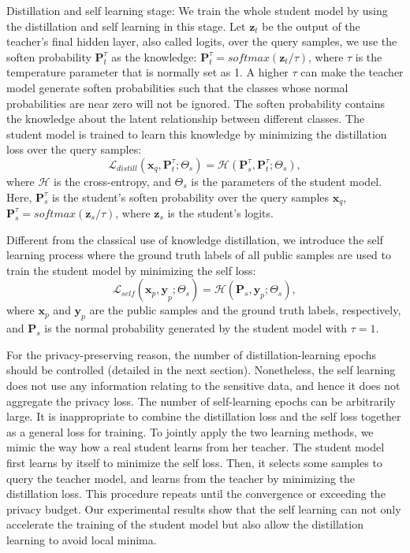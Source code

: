\documentclass[letterpaper]{article} %
\begin{document}
Distillation and self learning stage: We train the whole student model by using the distillation and self learning in this stage. Let $\textbf{z}_t$ be the output of the teacher's final hidden layer, also called logits, over the query samples, we use the soften probability \cite{hinton2015distilling} $\textbf{P}^\tau_t$ as the knowledge: $\textbf{P}^\tau_t=softmax(\textbf{z}_t/\tau)$, where $\tau$ is the temperature parameter that is normally set as 1. A higher $\tau$ can make the teacher model generate soften probabilities such that the classes whose normal probabilities are near zero will not be ignored. The soften probability contains the knowledge about the latent relationship between different classes. The student model is trained to learn this knowledge by minimizing the distillation loss over the query samples:
\begin{equation}\label{eqn:distill-loss}
\mathcal{ L }_{ distill }({ \textbf{x} }_{ q },\textbf{P}^\tau_{ t };{ \Theta  }_{ s })=\mathcal{H}(\textbf{P}^\tau_s, \textbf{P}^\tau_{ t };{ \Theta  }_{ s }),
\end{equation}
where $\mathcal{H}$ is the cross-entropy, and $\Theta_s$ is the parameters of the student model. Here, $\textbf{P}^\tau_s$ is the student's soften probability over the query samples $\textbf{x} _{ q }$, $\textbf{P}^\tau_s = softmax(\textbf{z}_s/\tau)$, where $\textbf{z}_s$ is the student's logits.

Different from the classical use of knowledge distillation, we introduce the self learning process where the ground truth labels of all public samples are used to train the student model by minimizing the self loss:
\begin{equation}\label{eqn:self-loss}
\mathcal{ L }_{ self }({ \textbf{x} _{ p }, \textbf{y} }_{ p };{ \Theta  }_{ s })=\mathcal{H}(\textbf{P}_s, \textbf{y} _{ p };{ \Theta  }_{ s }),
\end{equation}
where $\textbf{x} _{ p }$ and $\textbf{y} _{ p }$ are the public samples and the ground truth labels, respectively, and $\textbf{P}_s$ is the normal probability generated by the student model with $\tau=1$.

For the privacy-preserving reason, the number of distillation-learning epochs should be controlled (detailed in the next section). Nonetheless, the self learning does not use any information relating to the sensitive data, and hence it does not aggregate the privacy loss. The number of self-learning epochs can be arbitrarily large. It is inappropriate to combine the distillation loss and the self loss together as a general loss for training. To jointly apply the two learning methods, we mimic the way how a real student learns from her teacher. The student model first learns by itself to minimize the self loss. Then, it selects some samples to query the teacher model, and learns from the teacher by minimizing the distillation loss. This procedure repeats until the convergence or exceeding the privacy budget. Our experimental results show that the self learning can not only accelerate the training of the student model but also allow the distillation learning to avoid local minima. 
\end{document}
